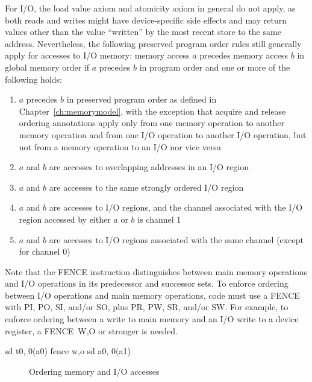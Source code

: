 For I/O, the load value axiom and atomicity axiom in general do not apply, as both reads and writes might have device-specific side effects and may return values other than the value ``written'' by the most recent store to the same address.
Nevertheless, the following preserved program order rules still generally apply for accesses to I/O memory:
memory access $a$ precedes memory access $b$ in global memory order if $a$ precedes $b$ in program order and one or more of the following holds:
\begin{enumerate}
  \item $a$ precedes $b$ in preserved program order as defined in Chapter~\ref{ch:memorymodel}, with the exception that acquire and release ordering annotations apply only from one memory operation to another memory operation and from one I/O operation to another I/O operation, but not from a memory operation to an I/O nor vice versa
  \item $a$ and $b$ are accesses to overlapping addresses in an I/O region
  \item $a$ and $b$ are accesses to the same strongly ordered I/O region
  \item $a$ and $b$ are accesses to I/O regions, and the channel associated with the I/O region accessed by either $a$ or $b$ is channel 1
  \item $a$ and $b$ are accesses to I/O regions associated with the same channel (except for channel 0)
\end{enumerate}

Note that the FENCE instruction distinguishes between main memory operations and I/O operations in its predecessor and successor sets.
To enforce ordering between I/O operations and main memory operations, code must use a FENCE with PI, PO, SI, and/or SO, plus PR, PW, SR, and/or SW.
For example, to enforce ordering between a write to main memory and an I/O write to a device register, a FENCE~W,O or stronger is needed.

\begin{verbbox}
  sd t0, 0(a0)
  fence w,o
  sd a0, 0(a1)
\end{verbbox}
\begin{figure}[h!]
  \centering\small
  \theverbbox
  \caption{Ordering memory and I/O accesses}
  \label{fig:litmus:wo}
\end{figure}

